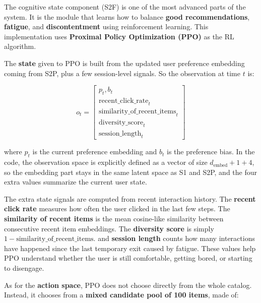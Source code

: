 The cognitive state component (S2F) is one of the most advanced parts of the system. 
It is the module that learns how to balance \textbf{good recommendations}, \textbf{fatigue}, and \textbf{discontentment} using reinforcement learning.
This implementation uses \textbf{Proximal Policy Optimization (PPO)} as the RL algorithm. 

The \textbf{state} given to PPO is built from the updated user preference embedding coming from S2P, plus a few session-level signals. 
So the observation at time $t$ is:

\begin{equation}
    o_t = \begin{bmatrix}
            p_t, b_t \\
            \text{recent\_click\_rate}_t \\
            \text{similarity\_of\_recent\_items}_t \\
            \text{diversity\_score}_t \\
            \text{session\_length}_t
           \end{bmatrix}
\end{equation}

where $p_t$ is the current preference embedding and $b_t$ is the preference bias. 
In the code, the observation space is explicitly defined as a vector of size $d_{\text{embed}} + 1 + 4$,
so the embedding part stays in the same latent space as S1 and S2P, and the four extra values summarize the current user state.


The extra state signals are computed from recent interaction history. 
The \textbf{recent click rate} measures how often the user clicked in the last few steps. 
The \textbf{similarity of recent items} is the mean cosine-like similarity between consecutive recent item embeddings. 
The \textbf{diversity score} is simply $1 - \text{similarity\_of\_recent\_items}$.
and \textbf{session length} counts how many interactions have happened since the last temporary exit caused by fatigue. 
These values help PPO understand whether the user is still comfortable, getting bored, or starting to disengage.

As for the \textbf{action space}, PPO does not choose directly from the whole catalog.
Instead, it chooses from a \textbf{mixed candidate pool of 100 items}, made of:

